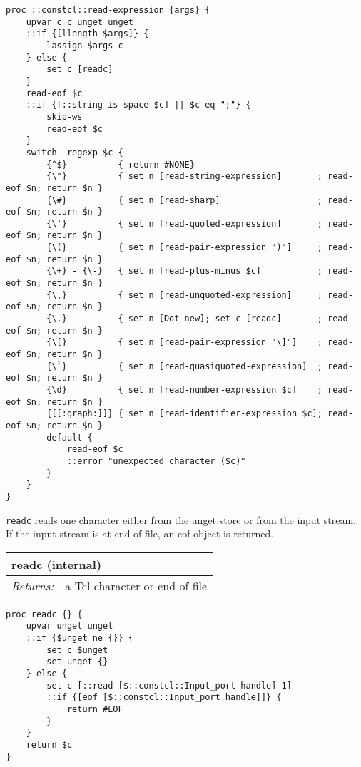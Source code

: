 \documentclass{report}
\begin{document}
\noindent\makebox[\linewidth]{\rule{\linewidth}{0.4pt}}
\begin{lstlisting}
proc ::constcl::read-expression {args} {
    upvar c c unget unget
    ::if {[llength $args]} {
        lassign $args c
    } else {
        set c [readc]
    }
    read-eof $c
    ::if {[::string is space $c] || $c eq ";"} {
        skip-ws
        read-eof $c
    }
    switch -regexp $c {
        {^$}          { return #NONE}
        {\"}          { set n [read-string-expression]       ; read-eof $n; return $n }
        {\#}          { set n [read-sharp]                   ; read-eof $n; return $n }
        {\'}          { set n [read-quoted-expression]       ; read-eof $n; return $n }
        {\(}          { set n [read-pair-expression ")"]     ; read-eof $n; return $n }
        {\+} - {\-}   { set n [read-plus-minus $c]           ; read-eof $n; return $n }
        {\,}          { set n [read-unquoted-expression]     ; read-eof $n; return $n }
        {\.}          { set n [Dot new]; set c [readc]       ; read-eof $n; return $n }
        {\[}          { set n [read-pair-expression "\]"]    ; read-eof $n; return $n }
        {\`}          { set n [read-quasiquoted-expression]  ; read-eof $n; return $n }
        {\d}          { set n [read-number-expression $c]    ; read-eof $n; return $n }
        {[[:graph:]]} { set n [read-identifier-expression $c]; read-eof $n; return $n }
        default {
            read-eof $c
            ::error "unexpected character ($c)"
        }
    }
}
\end{lstlisting}
\noindent\makebox[\linewidth]{\rule{\linewidth}{0.4pt}}

\texttt{readc} reads one character either from the unget store or from the input stream. If the input stream is at end-of-file, an eof object is returned.

\begin{tabular}{ |l l| }
\hline
\multicolumn{2}{|l|}{readc (internal)} \\
\hline
\textit{Returns:} & a Tcl character or end of file \\
\hline
\end{tabular}

\noindent\makebox[\linewidth]{\rule{\linewidth}{0.4pt}}
\begin{lstlisting}
proc readc {} {
    upvar unget unget
    ::if {$unget ne {}} {
        set c $unget
        set unget {}
    } else {
        set c [::read [$::constcl::Input_port handle] 1]
        ::if {[eof [$::constcl::Input_port handle]]} {
            return #EOF
        }
    }
    return $c
}
\end{lstlisting}
\noindent\makebox[\linewidth]{\rule{\linewidth}{0.4pt}}
\end{document}
